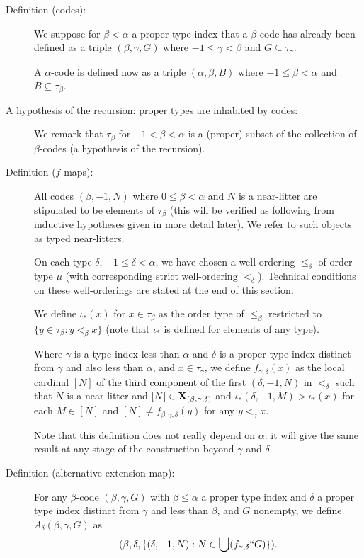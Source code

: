 \documentclass[112pt]{article}
\begin{document}
\begin{description}
\item[Definition (codes):]  We suppose for $\beta<\alpha$ a proper type index that a $\beta$-code has already been defined as a triple $(\beta,\gamma,G)$ where $-1 \leq \gamma<\beta$ and $G \subseteq \tau_{\gamma}$. 

A $\alpha$-code is defined now as a triple $(\alpha,\beta,B)$ where $-1 \leq \beta<\alpha$ and $B \subseteq \tau_{\beta}$.   

\item[A hypothesis of the recursion:  proper types are inhabited by codes:]

We remark that $\tau_\beta$ for $-1<\beta<\alpha$  is a (proper) subset of the collection of $\beta$-codes (a hypothesis of the recursion).

\item[Definition ($f$ maps):]  All codes $(\beta,-1,N)$ where $0\leq \beta<\alpha$ and $N$ is a near-litter are stipulated to be elements of $\tau_\beta$ (this will be verified as following from inductive hypotheses given in more detail later).   We refer to such objects as typed near-litters. 

 On each type $\delta$, $-1 \leq \delta <\alpha$, we have chosen a well-ordering $\leq_\delta$ of order type $\mu$ (with corresponding strict well-ordering $<_\delta$).  Technical conditions on these well-orderings are stated at the end of this section.

   We define $\iota_*(x)$ for $x \in \tau_\beta$ as the order type of $\leq_\beta$ restricted to $\{y \in \tau_\beta:y <_\beta x\}$ (note that $\iota_*$ is defined for elements of any type).

   Where $\gamma$ is a type index less than $\alpha$ and $\delta$ is a proper type index distinct from $\gamma$ and also less than $\alpha$, and $x \in \tau_\gamma$, we define $f_{\gamma,\delta}(x)$ as the local cardinal $[N]$ of the third component of the first $(\delta,-1,N)$ in $<_\delta$ such that $N$ is a near-litter and $[N] \in {\bf X}_{(\beta,\gamma,\delta)}$ and $\iota_*(\delta,-1,M)>\iota_*(x)$  for each $M \in [N]$ and $[N] \neq f_{\beta,\gamma,\delta}(y)$ for any $y <_\gamma x$.  

Note that this definition does not really depend on $\alpha$:  it will give the same result at any stage of the construction beyond $\gamma$ and $\delta$.

\item[Definition (alternative extension map):]  For any $\beta$-code $(\beta,\gamma,G)$ with $\beta \leq \alpha$ a proper type index and $\delta$ a proper type index distinct from $\gamma$ and less than $\beta$, and $G$ nonempty, we define
$A_\delta(\beta,\gamma,G)$ as $$(\beta,\delta,\{(\delta,-1,N):N \in \bigcup (f_{\gamma,\delta}``G)\}).$$


\end{description}
\end{document}
